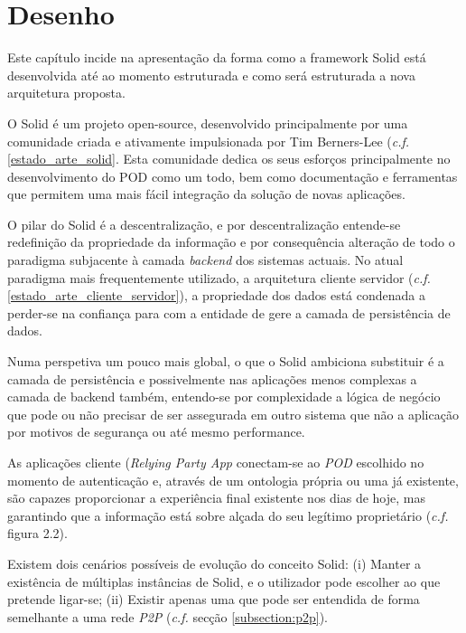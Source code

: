 
\chapter{Desenho \label{desenho}}
\label{cap:4}

Este capítulo incide na apresentação da forma como a framework Solid está desenvolvida até ao momento estruturada e como será estruturada a nova arquitetura proposta.

O Solid é um projeto open-source, desenvolvido principalmente por uma comunidade criada e ativamente impulsionada por Tim Berners-Lee (\emph{c.f.} \ref{estado_arte_solid}. Esta comunidade dedica os seus esforços principalmente no desenvolvimento do POD como um todo, bem como documentação e ferramentas que permitem uma mais fácil integração da solução de novas aplicações.

O pilar do Solid é a descentralização, e por descentralização entende-se redefinição da propriedade da informação e por consequência alteração de todo o paradigma subjacente à camada \emph{backend} dos sistemas actuais. No atual paradigma mais frequentemente utilizado, a arquitetura cliente servidor (\emph{c.f.} \ref{estado_arte_cliente_servidor}), a propriedade dos dados está condenada a perder-se na confiança para com a entidade de gere a camada de persistência de dados.

Numa perspetiva um pouco mais global, o que o Solid ambiciona substituir é a camada de persistência e possivelmente nas aplicações menos complexas a camada de backend também, entendo-se por complexidade a lógica de negócio que pode ou não precisar de ser assegurada em outro sistema que não a aplicação por motivos de segurança ou até mesmo performance.

As aplicações cliente (\emph{Relying Party App} conectam-se ao \emph{POD} escolhido no momento de autenticação e, através de um ontologia própria ou uma já existente, são capazes proporcionar a experiência final existente nos dias de hoje, mas garantindo que a informação está sobre alçada do seu legítimo proprietário (\emph{c.f.} figura 2.2).

Existem dois cenários possíveis de evolução do conceito Solid: (i) Manter a existência de múltiplas instâncias de Solid, e o utilizador pode escolher ao que pretende ligar-se; (ii) Existir apenas uma que pode ser entendida de forma semelhante a uma rede \emph{P2P} (\emph{c.f.} secção \ref{subsection:p2p}).

